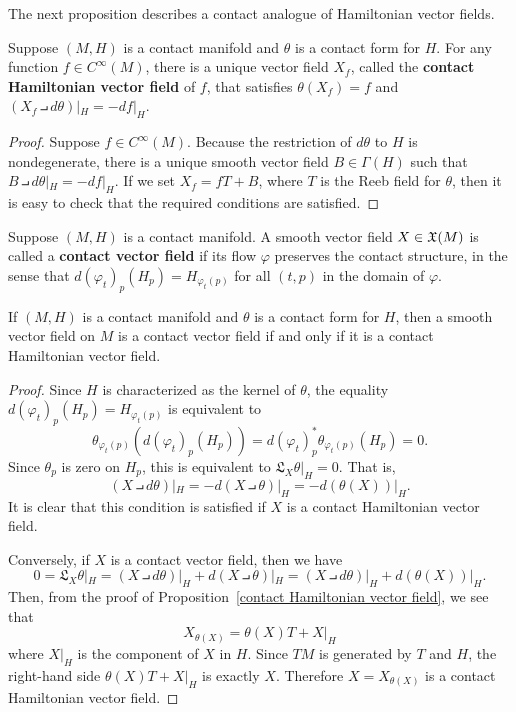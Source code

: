 The next proposition describes a contact analogue of Hamiltonian vector fields.
\begin{proposition}\label{contact Hamiltonian vector field}
Suppose $(M,H)$ is a contact manifold and $\theta$ is a contact form for $H$. For any function $f\in C^\infty(M)$, there is a unique vector field $X_f$, called the \textbf{contact Hamiltonian vector field} of $f$, that satisfies $\theta(X_f)=f$ and $(X_f\intprod d\theta)|_H=-df|_H$.
\end{proposition}
\begin{proof}
Suppose $f\in C^\infty(M)$. Because the restriction of $d\theta$ to $H$ is nondegenerate, there is a unique smooth vector field $B\in\Gamma(H)$ such that $B\intprod d\theta|_H=-df|_H$. If we set $X_f=fT+B$, where $T$ is the Reeb field for $\theta$, then it is easy to check that the required conditions are satisfied.
\end{proof}
Suppose $(M,H)$ is a contact manifold. A smooth vector field $X\in\mathfrak{X}(M)$ is
called a \textbf{contact vector field} if its flow $\varphi$ preserves the contact structure, in the sense that $d(\varphi_t)_p(H_p)=H_{\varphi_t(p)}$ for all $(t,p)$ in the domain of $\varphi$.
\begin{theorem}
If $(M,H)$ is a contact manifold and $\theta$ is a contact form for $H$, then a smooth vector field on $M$ is a contact vector field if and only if it is a contact Hamiltonian vector field.
\end{theorem}
\begin{proof}
Since $H$ is characterized as the kernel of $\theta$, the equality $d(\varphi_t)_p(H_p)=H_{\varphi_t(p)}$ is equivalent to
\[\theta_{\varphi_t(p)}(d(\varphi_t)_p(H_p))=d(\varphi_t)_p^*\theta_{\varphi_t(p)}(H_p)=0.\]
Since $\theta_p$ is zero on $H_p$, this is equivalent to $\mathfrak{L}_{X}\theta|_H=0$. That is,
\[(X\intprod d\theta)|_H=-d(X\intprod\theta)|_H=-d(\theta(X))|_H.\]
It is clear that this condition is satisfied if $X$ is a contact Hamiltonian vector field.\par
Conversely, if $X$ is a contact vector field, then we have
\[0=\mathfrak{L}_X\theta|_H=(X\intprod d\theta)|_H+d(X\intprod\theta)|_H=(X\intprod d\theta)|_H+d(\theta(X))|_H.\]
Then, from the proof of Proposition~\ref{contact Hamiltonian vector field}, we see that 
\[X_{\theta(X)}=\theta(X)T+X|_H\]
where $X|_H$ is the component of $X$ in $H$. Since $TM$ is generated by $T$ and $H$, the right-hand side $\theta(X)T+X|_H$ is exactly $X$. Therefore $X=X_{\theta(X)}$ is a contact Hamiltonian vector field.
\end{proof}
